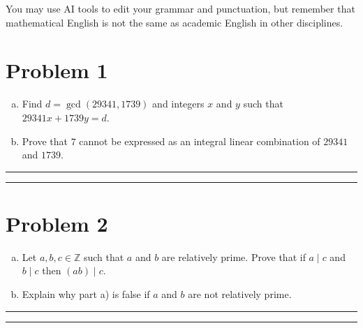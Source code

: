 \documentclass{article}
\theoremstyle{definition}
\newenvironment{solution}{\bigskip\hrule{\hfill}}{\bigskip\hrule{\hfill}} %
\begin{document}
You may use AI tools to edit your grammar and punctuation, but remember that mathematical English is not the same as academic English in other disciplines. 

\vfill

\newpage


\section*{Problem 1}
\begin{enumerate}[a)] %
    \item Find $d=\gcd\left(29341,1739\right)$ and integers $x$ and $y$ such that $29341x+1739y=d$.
    \item Prove that $7$ cannot be expressed as an integral linear combination of $29341$ and $1739$.
\end{enumerate}
\begin{solution}


\end{solution}


\newpage


\section*{Problem 2}
\begin{enumerate}[a)] %
    \item Let $a,b,c\in\mathbb{Z}$ such that $a$ and $b$ are relatively prime. Prove that if $a\mid c$ and $b\mid c$ then $\left(ab\right)\mid c$.
    \item Explain why part a) is false if $a$ and $b$ are not relatively prime.
\end{enumerate}
\begin{solution}


\end{solution}
\end{document}
